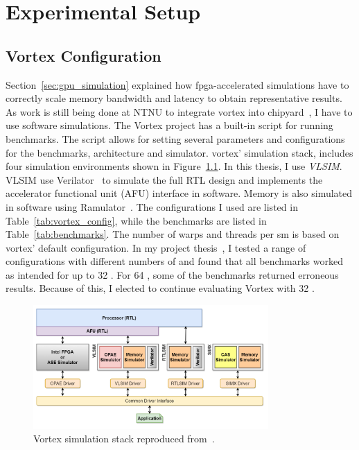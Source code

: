 \chapter{Experimental Setup} \label{chap:exp_setup}

\section{Vortex Configuration}

Section~\ref{sec:gpu_simulation} explained how \acrshort{fpga}-accelerated simulations have to correctly scale memory bandwidth and latency to obtain representative results. As work is still being done at NTNU to integrate \Gls{vortex} into chipyard~\cite{chipyard}, I have to use software simulations. The Vortex project has a built-in script for running benchmarks. The script allows for setting several parameters and configurations for the benchmarks, architecture and simulator. \Gls{vortex}' simulation stack, includes four simulation environments shown in Figure~\ref{fig:simstack}. In this thesis, I use \textit{VLSIM}. VLSIM use Verilator~\cite{verilator} to simulate the full RTL design and implements the accelerator functional unit (AFU) interface in software. Memory is also simulated in software using Ramulator~\cite{Ramulator}. The configurations I used are listed in Table~\ref{tab:vortex_config}, while the benchmarks are listed in Table~\ref{tab:benchmarks}. The number of warps and threads per \acrshort{sm} is based on \Gls{vortex}' default configuration. In my project thesis~\cite{Aurud_Project}, I tested a range of configurations with different numbers of  and found that all benchmarks worked as intended for up to 32 . For 64 , some of the benchmarks returned erroneous results. Because of this, I elected to continue evaluating Vortex with 32 .

\begin{figure}
    \centering
    \includegraphics[width=0.8\textwidth]{figures/simstack.png}
    \caption[Vortex simulation stack]{Vortex simulation stack reproduced from~\cite{vortex}.}
    \label{fig:simstack}
\end{figure}

